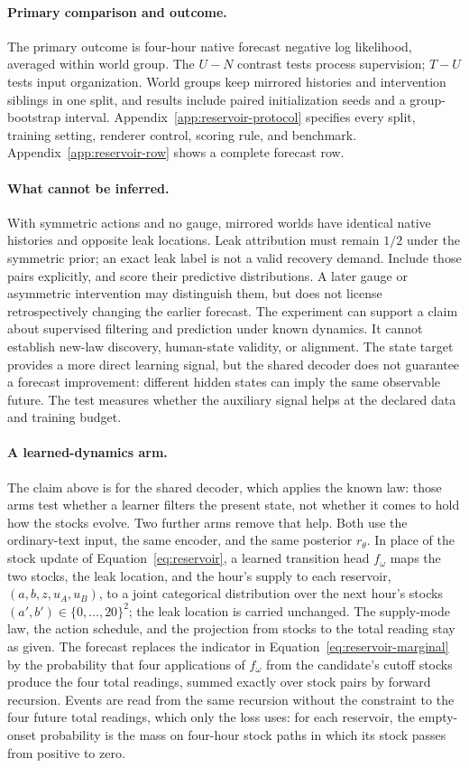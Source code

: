 \documentclass[10pt]{article}
\begin{document}
\paragraph{Primary comparison and outcome.}
The primary outcome is four-hour native forecast negative log likelihood,
averaged within world group. The $U-N$ contrast tests process supervision;
$T-U$ tests input organization. World groups keep mirrored histories and
intervention siblings in one split, and results include paired initialization
seeds and a group-bootstrap interval. Appendix~\ref{app:reservoir-protocol}
specifies every split, training setting, renderer control, scoring rule, and
benchmark. Appendix~\ref{app:reservoir-row} shows a complete forecast row.

\paragraph{What cannot be inferred.}
With symmetric actions and no gauge, mirrored worlds have identical native
histories and opposite leak locations. Leak attribution must remain $1/2$
under the symmetric prior; an exact leak label is not a valid recovery demand.
Include those pairs explicitly, and score their predictive distributions.
A later gauge or asymmetric intervention may distinguish them, but does not
license retrospectively changing the earlier forecast. The experiment can
support a claim about supervised filtering and prediction under known
dynamics. It cannot establish new-law discovery, human-state validity, or
alignment.
The state target provides a more direct learning signal, but the shared
decoder does not guarantee a forecast improvement: different hidden states
can imply the same observable future. The test measures whether the auxiliary
signal helps at the declared data and training budget.

\paragraph{A learned-dynamics arm.}
The claim above is for the shared decoder, which applies the known law: those arms
test whether a learner filters the present state, not whether it comes to hold how
the stocks evolve. Two further arms remove that help. Both use the ordinary-text
input, the same encoder, and the same posterior $r_\theta$. In place of the stock
update of Equation~\ref{eq:reservoir}, a learned transition head $f_\omega$ maps the
two stocks, the leak location, and the hour's supply to each reservoir,
$(a,b,z,u_A,u_B)$, to a joint categorical distribution over the next hour's stocks
$(a',b')\in\{0,\dots,20\}^2$; the leak location is carried unchanged. The
supply-mode law, the action schedule, and the projection from stocks to the total
reading stay as given. The forecast replaces the indicator in
Equation~\ref{eq:reservoir-marginal} by the probability that four applications of
$f_\omega$ from the candidate's cutoff stocks produce the four total readings, summed
exactly over stock pairs by forward recursion. Events are read from the same
recursion without the constraint to the four future total readings, which only the
loss uses: for each reservoir, the
empty-onset probability is the mass on four-hour stock paths in which its stock
passes from positive to zero.
\end{document}
